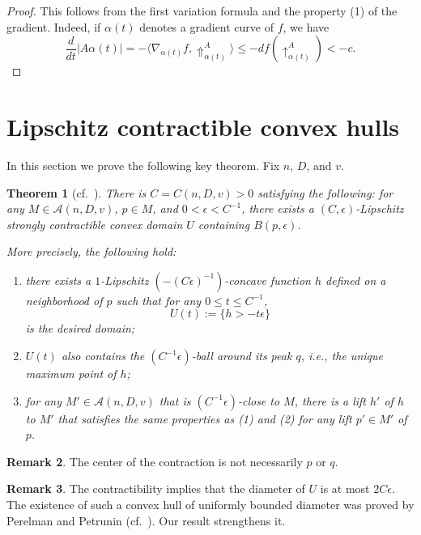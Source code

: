 \documentclass[a4paper,12pt]{amsart}
\theoremstyle{plain}
\newtheorem{thm}{Theorem}
\theoremstyle{definition}
\newtheorem{rem}[thm]{Remark}
\numberwithin{thm}{section}
\numberwithin{equation}{section}
\begin{document}
\begin{proof}
This follows from the first variation formula and the property (1) of the gradient.
Indeed, if $\alpha(t)$ denotes a gradient curve of $f$, we have
\[\frac d{dt}|A\alpha(t)|=-\langle\nabla_{\alpha(t)}f,\Uparrow_{\alpha(t)}^A\rangle\le-df(\uparrow_{\alpha(t)}^A)<-c.\]
\end{proof}

\section{Lipschitz contractible convex hulls}\label{sec:conv}

In this section we prove the following key theorem.
Fix $n$, $D$, and $v$.

\begin{thm}[cf.\ {\cite[4.3]{PP:ext}}]\label{thm:conv}
There is $C=C(n,D,v)>0$ satisfying the following:
for any $M \in\mathcal A(n,D,v)$, $p \in M$, and $0<\epsilon<C^{-1}$, there exists a $(C,\epsilon)$-Lipschitz strongly contractible convex domain $U$ containing $B(p,\epsilon)$.

More precisely, the following hold:
\begin{enumerate}
\item there exists a $1$-Lipschitz $(-(C\epsilon)^{-1})$-concave function $h$ defined on a neighborhood of $p$ such that for any $0\le t\le C^{-1}$,
\[U(t):=\{h>-t\epsilon\}\]
is the desired domain;
\item $U(t)$ also contains the $(C^{-1}\epsilon)$-ball around its peak $q$, i.e., the unique maximum point of $h$;
\item for any $M'\in\mathcal A(n,D,v)$ that is $(C^{-1}\epsilon)$-close to $M$, there is a lift $h'$ of $h$ to $M'$ that satisfies the same properties as (1) and (2) for any lift $p'\in M'$ of $p$.
\end{enumerate}
\end{thm}

\begin{rem}
The center of the contraction is not necessarily $p$ or $q$.
\end{rem}

\begin{rem}
The contractibility implies that the diameter of $U$ is at most $2C\epsilon$.
The existence of such a convex hull of uniformly bounded diameter was proved by Perelman and Petrunin \cite[4.3]{PP:ext} (cf.\ \cite[7.1.3]{Pet:sc}).
Our result strengthens it.
\end{rem}
\end{document}
